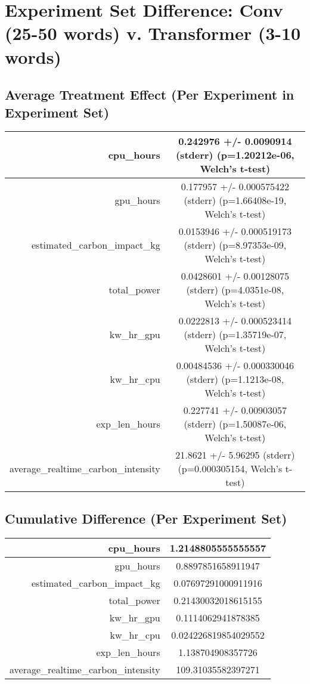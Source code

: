 \documentclass{article}%
\begin{document}
%
\normalsize%
\section{Experiment Set Difference: Conv (25{-}50 words) v. Transformer (3{-}10 words)}%
\label{sec:Experiment Set Difference Conv (25{-}50 words) v. Transformer (3{-}10 words)}%
\subsection{Average Treatment Effect (Per Experiment in Experiment Set)}%
\label{subsec:Average Treatment Effect (Per Experiment in Experiment Set)}%
\begin{tabular}{|r|c|}%
\hline%
cpu\_hours&0.242976 +/{-} 0.0090914 (stderr) (p=1.20212e{-}06, Welch's t{-}test)\\%
\hline%
gpu\_hours&0.177957 +/{-} 0.000575422 (stderr) (p=1.66408e{-}19, Welch's t{-}test)\\%
\hline%
estimated\_carbon\_impact\_kg&0.0153946 +/{-} 0.000519173 (stderr) (p=8.97353e{-}09, Welch's t{-}test)\\%
\hline%
total\_power&0.0428601 +/{-} 0.00128075 (stderr) (p=4.0351e{-}08, Welch's t{-}test)\\%
\hline%
kw\_hr\_gpu&0.0222813 +/{-} 0.000523414 (stderr) (p=1.35719e{-}07, Welch's t{-}test)\\%
\hline%
kw\_hr\_cpu&0.00484536 +/{-} 0.000330046 (stderr) (p=1.1213e{-}08, Welch's t{-}test)\\%
\hline%
exp\_len\_hours&0.227741 +/{-} 0.00903057 (stderr) (p=1.50087e{-}06, Welch's t{-}test)\\%
\hline%
average\_realtime\_carbon\_intensity&21.8621 +/{-} 5.96295 (stderr) (p=0.000305154, Welch's t{-}test)\\%
\hline%
\end{tabular}

%
\subsection{Cumulative Difference (Per Experiment Set)}%
\label{subsec:Cumulative Difference (Per Experiment Set)}%
\begin{tabular}{|r|c|}%
\hline%
cpu\_hours&1.2148805555555557\\%
\hline%
gpu\_hours&0.8897851658911947\\%
\hline%
estimated\_carbon\_impact\_kg&0.07697291000911916\\%
\hline%
total\_power&0.21430032018615155\\%
\hline%
kw\_hr\_gpu&0.1114062941878385\\%
\hline%
kw\_hr\_cpu&0.024226819854029552\\%
\hline%
exp\_len\_hours&1.138704908357726\\%
\hline%
average\_realtime\_carbon\_intensity&109.31035582397271\\%
\hline%
\end{tabular}

%
\end{document}
